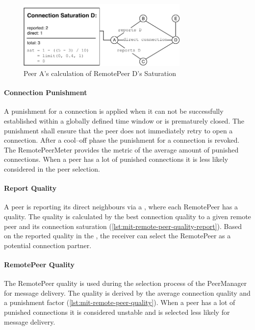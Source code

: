 \begin{figure}
\centering
\includegraphics[width=0.75\textwidth]{graphics/implementation/mitosis-architecture-Connection-Saturation.pdf}
\caption{Peer A's calculation of RemotePeer D's Saturation }
\label{fig:mit-remote-peer-saturation}
\end{figure}

\paragraph{Connection Punishment}
A punishment for a connection is applied when it can not be successfully established within a globally defined time window or is prematurely closed. The punishment shall ensure that the peer does not immediately retry to open a connection. After a cool–off phase the punishment for a connection is revoked.
The RemotePeerMeter provides the metric of the average amount of punished connections. When a peer has a lot of punished connections it is less likely considered in the peer selection.

\paragraph{Report Quality}\label{par:mit-report-quality}
A peer is reporting its direct neighbours via a \peerUpdate, where each RemotePeer has a quality. The quality is calculated by the best connection quality to a given remote peer and its connection saturation (\vref{lst:mit-remote-peer-quality-report}). Based on the reported quality in the \peerUpdate, the receiver can select the RemotePeer as a potential connection partner. 

\paragraph{RemotePeer Quality}
The RemotePeer quality is used during the selection process of the PeerManager for message delivery. The quality is derived by the average connection quality and a punishment factor (\vref{lst:mit-remote-peer-quality}). When a peer has a lot of punished connections it is considered unstable and is selected less likely for message delivery.


